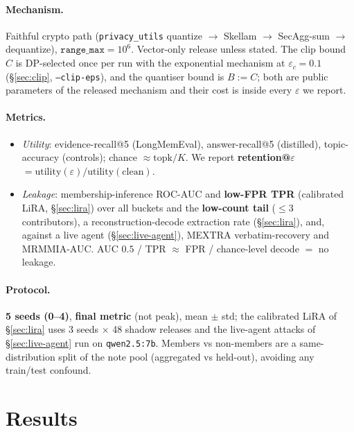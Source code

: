 \documentclass[pdflatex,sn-mathphys-num,12pt]{sn-jnl}
\theoremstyle{thmstyleone}%
\theoremstyle{thmstyletwo}%
\theoremstyle{thmstylethree}%
\newcommand{\eps}{\varepsilon}
\newcommand{\secref}[1]{\S\ref{#1}}
\begin{document}
\paragraph{Mechanism.} Faithful crypto path (\texttt{privacy\_utils} quantize $\to$
Skellam $\to$ SecAgg-sum $\to$ dequantize), $\texttt{range\_max} = 10^{6}$. Vector-only
release unless stated. The clip bound $C$ is DP-selected once per run with the
exponential mechanism at $\eps_c = 0.1$ (\secref{sec:clip}, \texttt{--clip-eps}), and the
quantiser bound is $B := C$; both are public parameters of the released mechanism and
their cost is inside every $\eps$ we report.

\paragraph{Metrics.}
\begin{itemize}
  \item \emph{Utility}: evidence-recall@5 (LongMemEval), answer-recall@5 (distilled),
    topic-accuracy (controls); chance $\approx \mathrm{topk}/K$. We report
    \textbf{retention@$\eps$} $= \mathrm{utility}(\eps) / \mathrm{utility}(\text{clean})$.
  \item \emph{Leakage}: membership-inference ROC-AUC and \textbf{low-FPR TPR}
    (calibrated LiRA, \secref{sec:lira}) over all buckets and the \textbf{low-count tail}
    ($\leq 3$ contributors), a reconstruction-decode extraction rate
    (\secref{sec:lira}), and, against a live agent (\secref{sec:live-agent}), MEXTRA
    verbatim-recovery and MRMMIA-AUC. AUC $0.5$ / TPR $\approx$ FPR / chance-level decode
    $=$ no leakage.
\end{itemize}

\paragraph{Protocol.} \textbf{5 seeds (0--4)}, \textbf{final metric} (not peak),
mean $\pm$ std; the calibrated LiRA of \secref{sec:lira} uses 3 seeds $\times$ 48 shadow
releases and the live-agent attacks of \secref{sec:live-agent} run on
\texttt{qwen2.5:7b}. Members vs non-members are a same-distribution split of the note
pool (aggregated vs held-out), avoiding any train/test confound.

\section{Results}\label{sec:results}
\end{document}
